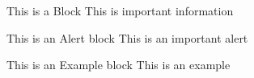 \documentclass{beamer}
\begin{document}
\begin{frame}
 
   \begin{block}{This is a Block}
      This is important information
   \end{block}
 
   \begin{alertblock}{This is an Alert block}
   This is an important alert
   \end{alertblock}
 
   \begin{exampleblock}{This is an Example block}
   This is an example 
   \end{exampleblock}
 
\end{frame}
\end{document}
